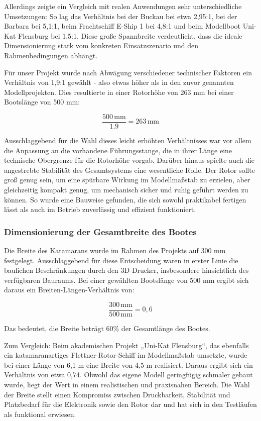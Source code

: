 \documentclass[a4paper,12pt]{article}
\begin{document}
Allerdings zeigte ein Vergleich mit realen Anwendungen sehr unterschiedliche Umsetzungen: So lag das Verhältnis bei der Buckau bei etwa 2,95:1, bei der Barbara bei 5,1:1, beim Frachtschiff E-Ship 1 bei 4,8:1 und beim Modellboot Uni-Kat Flensburg bei 1,5:1. Diese große Spannbreite verdeutlicht, dass die ideale Dimensionierung stark vom konkreten Einsatzszenario und den Rahmenbedingungen abhängt.

Für unser Projekt wurde nach Abwägung verschiedener technischer Faktoren ein Verhältnis von 1,9:1 gewählt - also etwas höher als in den zuvor genannten Modellprojekten. Dies resultierte in einer Rotorhöhe von 263 mm bei einer Bootslänge von 500 mm:

\[
\frac{500 \, \text{mm}}{1.9} = 263 \, \text{mm}
\]

Ausschlaggebend für die Wahl dieses leicht erhöhten Verhältnisses war vor allem die Anpassung an die vorhandene Führungsstange, die in ihrer Länge eine technische Obergrenze für die Rotorhöhe vorgab. Darüber hinaus spielte auch die angestrebte Stabilität des Gesamtsystems eine wesentliche Rolle. Der Rotor sollte groß genug sein, um eine spürbare Wirkung im Modellmaßstab zu erzielen, aber gleichzeitig kompakt genug, um mechanisch sicher und ruhig geführt werden zu können. So wurde eine Bauweise gefunden, die sich sowohl praktikabel fertigen lässt als auch im Betrieb zuverlässig und effizient funktioniert.

\subsubsection{Dimensionierung der Gesamtbreite des Bootes}

Die Breite des Katamarans wurde im Rahmen des Projekts auf 300 mm festgelegt. Ausschlaggebend für diese Entscheidung waren in erster Linie die baulichen Beschränkungen durch den 3D-Drucker, insbesondere hinsichtlich des verfügbaren Bauraums. Bei einer gewählten Bootslänge von 500 mm ergibt sich daraus ein Breiten-Längen-Verhältnis von:

\[
\frac{300\, \text{mm}}{500\, \text{mm}} = 0{,}6
\]

Das bedeutet, die Breite beträgt 60\% der Gesamtlänge des Bootes.

Zum Vergleich: Beim akademischen Projekt „Uni-Kat Flensburg“, das ebenfalls ein katamaranartiges Flettner-Rotor-Schiff im Modellmaßstab umsetzte, wurde bei einer Länge von 6,1 m eine Breite von 4,5 m realisiert. Daraus ergibt sich ein Verhältnis von etwa 0,74. Obwohl das eigene Modell geringfügig schmaler gebaut wurde, liegt der Wert in einem realistischen und praxisnahen Bereich. Die Wahl der Breite stellt einen Kompromiss zwischen Druckbarkeit, Stabilität und Platzbedarf für die Elektronik sowie den Rotor dar und hat sich in den Testläufen als funktional erwiesen.\cite{Flettner_Uni_Flensburg}
\end{document}

